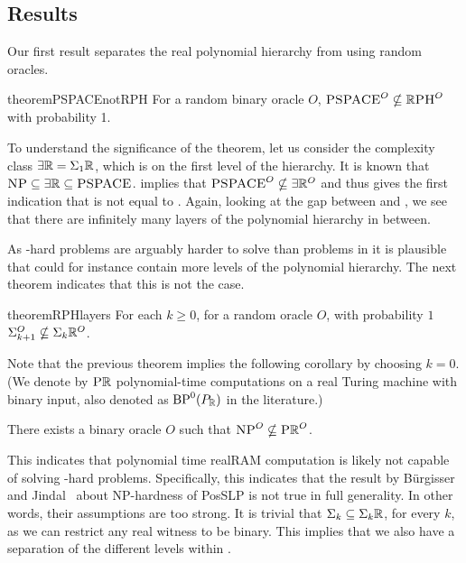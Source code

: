 \documentclass{article}
\begin{document}
\subsection{Results}
    Our first result separates the real polynomial hierarchy 
    from \PSPACE using random oracles.

    \begin{restatable}{theorem}{PSPACEnotRPH}
        \label{thm:PSPACEnotRPH}
        For a random binary oracle $O$,
        $\textsc{PSPACE}^O \nsubseteq \mathbb{R}\textsc{PH}^O$ with probability 1.
    \end{restatable}

    To understand the significance of the theorem, let us consider the complexity class $\exists\mathbb{R} = \Sigma_{1}\mathbb{R}$, which is on the first level of the hierarchy.
    It is known that $\textsc{NP} \subseteq \exists\mathbb{R} \subseteq \textsc{PSPACE}$.
     implies that $\textsc{PSPACE}^O \nsubseteq \exists\mathbb{R}^O$ and thus gives the first indication that \ER is not equal to \PSPACE.
% 
    Again, looking at the gap between \NP and \PSPACE, we see that there are infinitely many layers of the polynomial hierarchy in between.

    
    As \ER-hard problems are arguably harder to solve than
    problems in \NP
    it is plausible that \ER 
    could for instance contain more levels of the polynomial hierarchy.
    The next theorem indicates that this is not the case.
    
    \begin{restatable}{theorem}{RPHlayers}
    \label{thm:RPHlayers}
        For each $k\geq 0$,
        for a random oracle $O$, with probability $1$ $\Sigma_{k+1}^{O} \nsubseteq \Sigma_{k}\mathbb{R}^O$. 
    \end{restatable}
   

    Note that the previous theorem implies the following corollary by choosing $k=0$.
    (We denote by $\textsc{P\ensuremath{\mathbb{R}}}$ polynomial-time computations on a real Turing machine with binary input, also denoted as $\text{BP}^0(P_{\mathbb{R}})$ in the literature.)

    \begin{corollary}
        There exists a
        binary oracle $O$ such that $\textsc{NP}^O \nsubseteq \textsc{P\ensuremath{\mathbb{R}}}^O$.    
    \end{corollary}

    This indicates that polynomial time realRAM computation 
    is likely not capable of solving \NP-hard problems.
    Specifically, this indicates that the 
    result by B\"{u}rgisser and Jindal~\cite{BJ24} about NP-hardness of PosSLP is not true in full generality.
    In other words, their assumptions are too strong.
    It is trivial that $\Sigma_{k} \subseteq \Sigma_{k}\mathbb{R}$, for every $k$, as we can restrict any real witness to be binary.
    This implies that we also have a separation of the  different levels within \RPH.
\end{document}
